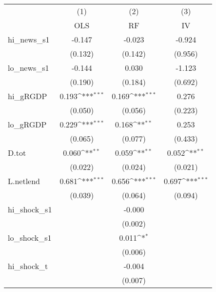 {
\def\sym#1{\ifmmode^{#1}\else\(^{#1}\)\fi}
\begin{tabular}{l*{3}{c}}
\toprule
            &\multicolumn{1}{c}{(1)}&\multicolumn{1}{c}{(2)}&\multicolumn{1}{c}{(3)}\\
            &\multicolumn{1}{c}{OLS}&\multicolumn{1}{c}{RF}&\multicolumn{1}{c}{IV}\\
\midrule
hi\_news\_s1  &      -0.147         &      -0.023         &      -0.924         \\
            &     (0.132)         &     (0.142)         &     (0.956)         \\
\addlinespace
lo\_news\_s1  &      -0.144         &       0.030         &      -1.123         \\
            &     (0.190)         &     (0.184)         &     (0.692)         \\
\addlinespace
hi\_gRGDP    &       0.193\sym{***}&       0.169\sym{***}&       0.276         \\
            &     (0.050)         &     (0.056)         &     (0.223)         \\
\addlinespace
lo\_gRGDP    &       0.229\sym{***}&       0.168\sym{**} &       0.253         \\
            &     (0.065)         &     (0.077)         &     (0.433)         \\
\addlinespace
D.tot       &       0.060\sym{**} &       0.059\sym{**} &       0.052\sym{**} \\
            &     (0.022)         &     (0.024)         &     (0.021)         \\
\addlinespace
L.netlend   &       0.681\sym{***}&       0.656\sym{***}&       0.697\sym{***}\\
            &     (0.039)         &     (0.064)         &     (0.094)         \\
\addlinespace
hi\_shock\_s1 &                     &      -0.000         &                     \\
            &                     &     (0.002)         &                     \\
\addlinespace
lo\_shock\_s1 &                     &       0.011\sym{*}  &                     \\
            &                     &     (0.006)         &                     \\
\addlinespace
hi\_shock\_t  &                     &      -0.004         &                     \\
            &                     &     (0.007)         &                     \\

\end{tabular}}
